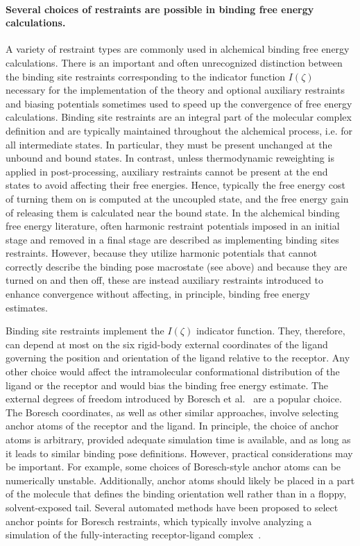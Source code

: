 \documentclass[9pt,bestpractices]{livecoms}
\begin{document}
\paragraph{Several choices of restraints are possible in binding free energy calculations.}
A variety of restraint types are commonly used in alchemical binding free energy calculations. There is an important and often unrecognized distinction between the binding site restraints corresponding to the indicator function $I(\zeta)$ necessary for the implementation of the theory and optional auxiliary restraints and biasing potentials sometimes used to speed up the convergence of free energy calculations. Binding site restraints are an integral part of the molecular complex definition and are typically maintained throughout the alchemical process, i.e. for all intermediate states. In particular, they must be present unchanged at the unbound and bound states. In contrast, unless thermodynamic reweighting is applied in post-processing, auxiliary restraints cannot be present at the end states to avoid affecting their free energies. Hence, typically the free energy cost of turning them on is computed at the uncoupled state, and the free energy gain of releasing them is calculated near the bound state. In the alchemical binding free energy literature, often harmonic restraint potentials imposed in an initial stage and removed in a final stage are described as implementing binding sites restraints. However, because they utilize harmonic potentials that cannot correctly describe the binding pose macrostate (see above) and because they are turned on and then off, these are instead auxiliary restraints introduced to enhance convergence without affecting, in principle, binding free energy estimates.

Binding site restraints implement the $I(\zeta)$ indicator function. They, therefore, can depend at most on the six rigid-body external coordinates of the ligand governing the position and orientation of the ligand relative to the receptor. Any other choice would affect the intramolecular conformational distribution of the ligand or the receptor and would  bias the binding free energy estimate. The external degrees of freedom introduced by Boresch et al.~\cite{boresch2003absolute,leitgeb2005alchemical} are a popular choice. The Boresch coordinates, as well as other similar approaches, involve selecting anchor atoms of the receptor and the ligand. In principle, the choice of anchor atoms is arbitrary, provided adequate simulation time is available, and as long as it leads to similar binding pose definitions. However, practical considerations may be important. For example, some choices of Boresch-style anchor atoms can be numerically unstable. Additionally, anchor atoms should likely be placed in a part of the molecule that defines the binding orientation well rather than in a floppy, solvent-exposed tail. Several automated methods have been proposed to select anchor points for Boresch restraints, which typically involve analyzing a simulation of the fully-interacting receptor-ligand complex~\cite{alibay2022evaluating, alibay2021mdrestraintsgenerator, baumann2023broadening, chen2023enhancing, hedges2023suite, wu2025optimizing}.
\end{document}
